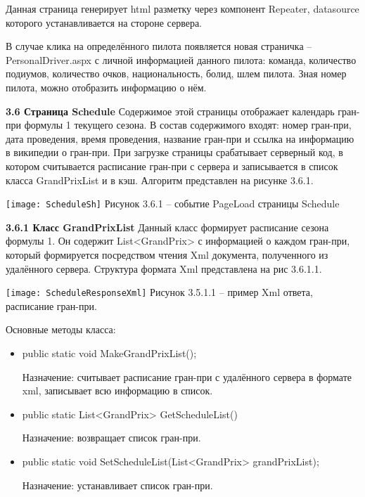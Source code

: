 \documentclass[14pt,a4paper]{extreport}
\begin{document}
Данная страница генерирует html разметку через компонент Repeater, datasource которого устанавливается на стороне сервера.\par
В случае клика на определённого пилота появляется новая страничка – PersonalDriver.aspx с личной информацией данного пилота: команда, количество подиумов, количество очков, национальность, болид, шлем пилота. Зная номер пилота, можно отобразить информацию о нём.\par
	\flushleft\hspace{4ex}\textbf{3.6 Страница Schedule}
\flushleft\hspace{4ex}Содержимое этой страницы отображает календарь гран-при формулы 1 текущего сезона. В состав содержимого входят: номер гран-при, дата проведения, время проведения, название гран-при и ссылка на информацию в википедии о гран-при. При загрузке страницы срабатывает серверный код, в котором считывается расписание гран-при с сервера и записывается в список класса GrandPrixList и в кэш. Алгоритм представлен на рисунке 3.6.1.\par
	\center\texttt{[image: ScheduleSh]}   
           \center Рисунок 3.6.1 – событие PageLoad страницы Schedule \par
	\flushleft\hspace{4ex}\textbf{3.6.1 Класс GrandPrixList}
\flushleft\hspace{4ex}Данный класс формирует расписание сезона формулы 1. Он содержит List<GrandPrix>  с информацией о каждом гран-при, который формируется посредством чтения  Xml документа, полученного из удалённого сервера.
Структура формата Xml представлена на рис 3.6.1.1.\par
	\texttt{[image: ScheduleResponseXml]}   
           \center Рисунок 3.5.1.1 – пример Xml ответа, расписание гран-при.\par
\flushleft\hspace{4ex}Основные методы класса:\par
\begin{itemize}
\item public static void MakeGrandPrixList();\par
Назначение: считывает расписание гран-при с удалённого сервера в формате xml, записывает всю информацию в список.\par

\item public static List<GrandPrix> GetScheduleList()\par
Назначение: возвращает список гран-при.\par

\item public static void SetScheduleList(List<GrandPrix> grandPrixList);\par
Назначение: устанавливает список гран-при.\par
\end{itemize}
\end{document}
